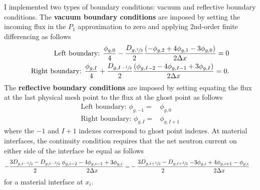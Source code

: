 I implemented two types of boundary conditions: vacuum and reflective boundary conditions. The
\textbf{vacuum boundary conditions} are imposed by setting the incoming flux in the $P_1$
approximation to zero and applying 2nd-order finite differencing as follows
%
\begin{align}
  \mbox{Left boundary: } \frac{\phi_{g,0}}{4}-\frac{D_{g,\sfrac{1}{2}}}{2}
  \frac{\left(-\phi_{g,2}+4\phi_{g,1}-3\phi_{g,0}\right)}{2\Delta x} = 0 \\
  \mbox{Right boundary: } \frac{\phi_{g,I}}{4}+\frac{D_{g,I-\sfrac{1}{2}}}{2}
  \frac{\left(\phi_{g,I-2}-4\phi_{g,I-1}+3\phi_{g,I}\right)}{2\Delta x} = 0.
\end{align}
%
The \textbf{reflective boundary conditions} are imposed by setting equating the flux at the last physical
mesh point to the flux at the ghost point as follows
%
\begin{align}
  \mbox{Left boundary: } \phi_{g,-1} =& \phi_{g,0} \\
  \mbox{Right boundary: } \phi_{g,I} =& \phi_{g,I+1}
\end{align}
%
where the $-1$ and $I+1$ indexes correspond to ghost point indexes. At material interfaces,
the continuity condition requires that the net neutron current on either side of the interface be
equal as follows
%
\begin{align}
  -\frac{3D_{g,i-\sfrac{1}{2}} - D_{g,i-\sfrac{3}{2}} }{2}
  \frac{\phi_{g,i-2}-4\phi_{g,i-1}+3\phi_{g,i}}{2\Delta x} =&
  -\frac{3D_{g,i+\sfrac{1}{2}} - D_{g,i+\sfrac{3}{2}} }{2}
  \frac{-3\phi_{g,i}+4\phi_{g,i+1}-\phi_{g,i}}{2\Delta x} \label{eq:itf-bc}
\end{align}
%
for a material interface at $x_i$.

